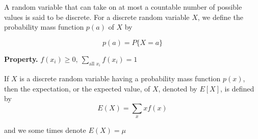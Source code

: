 \begin{defn}
	A random variable that can take on at most a countable number of possible values is said to be discrete. For a discrete random variable $X$, we define the probability mass function $p(a)$ of $X$ by
	
	$$p(a) = P\{X = a\}$$
\end{defn}

\textbf{Property.} $f(x_i) \geq 0,~\sum_{\text{all }x_i}f(x_i) = 1$
%	
%
%
%	

%	

\begin{defn}
	If $X$ is a discrete random variable having a probability mass function $p(x)$, then the expectation, or the expected value, of $X$, denoted by $E\left[X\right]$, is defined by	
	$$E(X) = \sum_{x}xf(x)$$
	
	and we some times denote $E(X)= \mu$
\end{defn}

